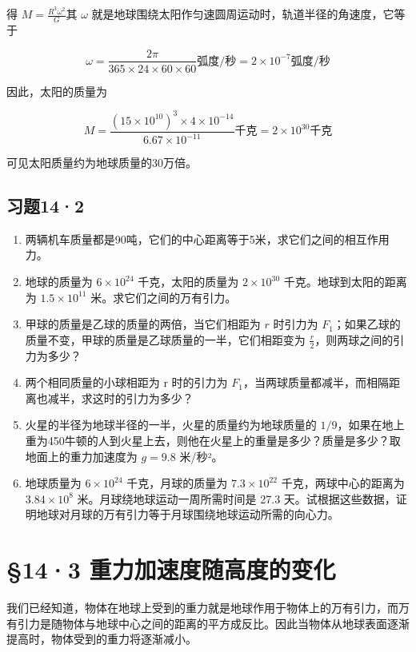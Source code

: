 得 \(M = \frac{R^3\omega^2}{G}\)其 \(\omega\)
就是地球围绕太阳作匀速圆周运动时，轨道半径的角速度，它等于

\[
\omega = \frac {2 \pi}{365 \times 24 \times 60 \times 60} \text{弧度/秒} = 2 \times 10 ^ {- 7} \text{弧度/秒}
\]

因此，太阳的质量为

\[
M = \frac {(15 \times 10 ^ {10}) ^ {3} \times 4 \times 10 ^ {- 14}}{6.67 \times 10 ^ {- 11}} \text{千克} = 2 \times 10 ^ {30} \text{千克}
\]

可见太阳质量约为地球质量的30万倍。

\subsection{习题14·2}\label{ux4e60ux9898142}

\begin{enumerate}
\def\labelenumi{\arabic{enumi}.}
\item
  两辆机车质量都是90吨，它们的中心距离等于5米，求它们之间的相互作用力。
\item
  地球的质量为 \(6 \times 10^{24}\) 千克，太阳的质量为
  \(2 \times 10^{30}\) 千克。地球到太阳的距离为 \(1.5 \times 10^{11}\)
  米。求它们之间的万有引力。
\item
  甲球的质量是乙球的质量的两倍，当它们相距为 \(r\) 时引力为
  \(F_{1}\)；如果乙球的质量不变，甲球的质量是乙球质量的一半，它们相距变为
  \(\frac{r}{2}\)，则两球之间的引力为多少？
\item
  两个相同质量的小球相距为 r 时的引力为
  \(F_{1}\)，当两球质量都减半，而相隔距离也减半，求这时的引力为多少？
\item
  火星的半径为地球半径的一半，火星的质量约为地球质量的
  \(1/9\)，如果在地上重为450牛顿的人到火星上去，则他在火星上的重量是多少？质量是多少？取地面上的重力加速度为
  \(g = 9.8\) 米/秒²。
\item
  地球质量为 \(6 \times 10^{24}\) 千克，月球的质量为
  \(7.3 \times 10^{22}\) 千克，两球中心的距离为 \(3.84 \times 10^{8}\)
  米。月球绕地球运动一周所需时间是 27.3
  天。试根据这些数据，证明地球对月球的万有引力等于月球围绕地球运动所需的向心力。
\end{enumerate}

\section{§14·3
重力加速度随高度的变化}\label{ux91cdux529bux52a0ux901fux5ea6ux968fux9ad8ux5ea6ux7684ux53d8ux5316}

我们已经知道，物体在地球上受到的重力就是地球作用于物体上的万有引力，而万有引力是随物体与地球中心之间的距离的平方成反比。因此当物体从地球表面逐渐提高时，物体受到的重力将逐渐减小。

